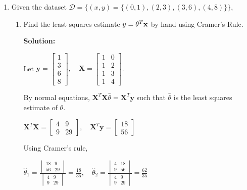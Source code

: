 \documentclass[letter,11pt]{article}
\newenvironment{solution}{
    \vspace{0.16in} {\bf Solution:}
    
}{
	\vspace{0.16in}
}
\begin{document}
\begin{enumerate}
    \newpage


    \item Given the dataset $\mathcal{D} = \{(x, y) = \{(0, 1), (2, 3), (3, 6), (4, 8)\}\}$,

    \begin{enumerate}
        \item Find the least squares estimate $y = \theta^T {\bf x}$ by hand using Cramer's Rule.

        \begin{solution}
            Let $\textbf{y} = \begin{bmatrix} 1 \\ 3 \\ 6 \\ 8 \end{bmatrix}, \quad \textbf{X} = \begin{bmatrix} 1 & 0 \\ 1 & 2 \\ 1 & 3 \\ 1 & 4 \end{bmatrix}$.
            
            By normal equations, $\textbf{X}^T \textbf{X} \hat{\theta} = \textbf{X}^T \textbf{y}$ such that $\hat{\theta}$ is the least squares estimate of $\theta$.

            $\textbf{X}^T \textbf{X} = \begin{bmatrix} 4 & 9 \\ 9 & 29 \end{bmatrix}, \quad \textbf{X}^T \textbf{y} = \begin{bmatrix}
                18 \\ 56
            \end{bmatrix}$

            Using Cramer's rule,

            $\displaystyle \hat{\theta}_1 = \frac{\begin{vmatrix} 18 & 9 \\ 56 & 29 \end{vmatrix}}{\begin{vmatrix} 4 & 9 \\ 9 & 29 \end{vmatrix}} = \frac{18}{35}, \quad \hat{\theta}_2 = \frac{\begin{vmatrix} 4 & 18 \\ 9 & 56 \end{vmatrix}}{\begin{vmatrix} 4 & 9 \\ 9 & 29 \end{vmatrix}} = \frac{62}{35}$
            

\end{solution}
\end{enumerate}
\end{enumerate}
\end{document}
